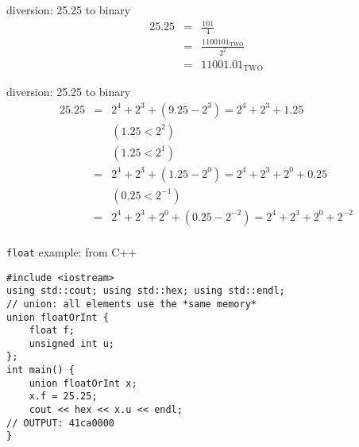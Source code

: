 \begin{frame}{diversion: 25.25 to binary}
\begin{eqnarray*}
    25.25 &=& \frac{101}{4} \\
          &=& \frac{1100101_\text{TWO}}{2^2} \\
          &=& 11001.01_\text{TWO}
\end{eqnarray*}
\end{frame}

\begin{frame}{diversion: 25.25 to binary}
\begin{eqnarray*}
    25.25 &=& 2^4 + 2^3 + (9.25-2^3) = 2^4 + 2^3 + 1.25 \\
          &~& (1.25 < 2^2) \\
          &~& (1.25 < 2^1) \\
          &=& 2^4 + 2^3 + (1.25-2^0) = 2^4 + 2^3 + 2^0 + 0.25 \\
          &~& (0.25 < 2^{-1}) \\
          &=& 2^4 + 2^3 + 2^0 + (0.25 - 2^{-2}) = 2^4 + 2^3 + 2^0 + 2^{-2} \\
\end{eqnarray*}
\end{frame}

\begin{frame}[fragile,label=floatUnion]{\texttt{float} example: from C++}
\lstset{
    language=C++,
    style=smaller
}
\begin{lstlisting}
#include <iostream>
using std::cout; using std::hex; using std::endl;
// union: all elements use the *same memory*
union floatOrInt {
    float f;
    unsigned int u;
};
int main() {
    union floatOrInt x;
    x.f = 25.25;
    cout << hex << x.u << endl;
// OUTPUT: 41ca0000
}
\end{lstlisting}
\end{frame}

